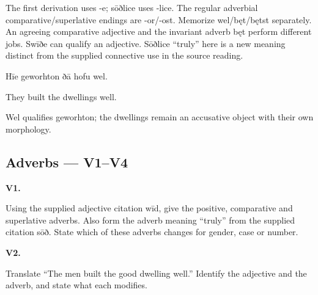 The first derivation uses -e; sōðlice uses -lice. The regular adverbial comparative/\allowbreak{}superlative endings are -or/\allowbreak{}-ost. Memorize wel/\allowbreak{}bęt/\allowbreak{}bętst separately. An agreeing comparative adjective and the invariant adverb bęt perform different jobs. Swīðe can qualify an adjective. Sōðlice “truly” here is a new meaning distinct from the supplied connective use in the source reading.

Hīe geworhton ðā hofu wel.

They built the dwellings well.

Wel qualifies geworhton; the dwellings remain an accusative object with their own morphology.

\subsection*{Adverbs — V1–V4}

\par\begin{minipage}{\linewidth}\raggedright
\textbf{V1.}

Using the supplied adjective citation wīd, give the positive, comparative and superlative adverbs. Also form the adverb meaning “truly” from the supplied citation sōð. State which of these adverbs changes for gender, case or number.

\end{minipage}\par\addvspace{4pt}

\par\begin{minipage}{\linewidth}\raggedright
\textbf{V2.}

Translate “The men built the good dwelling well.” Identify the adjective and the adverb, and state what each modifies.

\end{minipage}\par\addvspace{4pt}

